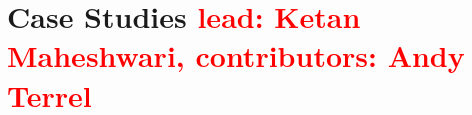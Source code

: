 \documentclass[11pt, oneside]{amsart}
\newcommand{\note}[1]{ {\textcolor{red}    { #1 }}}
\begin{document}
\section{Case Studies \note{lead: Ketan Maheshwari, contributors: Andy Terrel}} \label{sec:use-cases}









\end{document}
